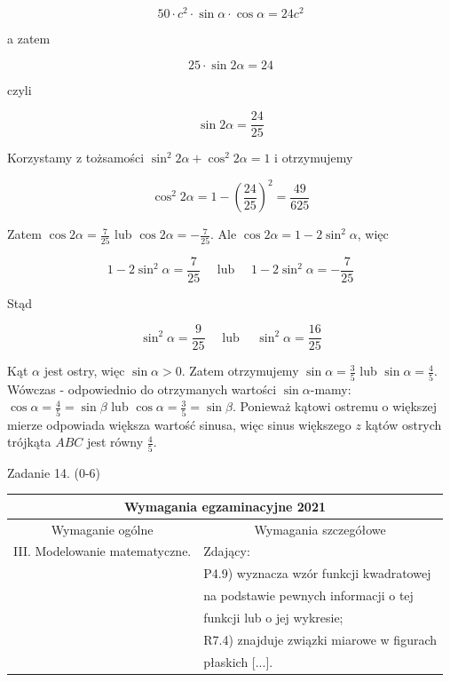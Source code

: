 \documentclass[10pt]{article}
\begin{document}
$$
50 \cdot c^{2} \cdot \sin \alpha \cdot \cos \alpha=24 c^{2}
$$

a zatem

$$
25 \cdot \sin 2 \alpha=24
$$

czyli

$$
\sin 2 \alpha=\frac{24}{25}
$$

Korzystamy z tożsamości $\sin ^{2} 2 \alpha+\cos ^{2} 2 \alpha=1$ i otrzymujemy

$$
\cos ^{2} 2 \alpha=1-\left(\frac{24}{25}\right)^{2}=\frac{49}{625}
$$

Zatem $\cos 2 \alpha=\frac{7}{25}$ lub $\cos 2 \alpha=-\frac{7}{25}$. Ale $\cos 2 \alpha=1-2 \sin ^{2} \alpha$, więc

$$
1-2 \sin ^{2} \alpha=\frac{7}{25} \quad \text { lub } \quad 1-2 \sin ^{2} \alpha=-\frac{7}{25}
$$

Stąd

$$
\sin ^{2} \alpha=\frac{9}{25} \quad \text { lub } \quad \sin ^{2} \alpha=\frac{16}{25}
$$

Kąt $\alpha$ jest ostry, więc $\sin \alpha>0$. Zatem otrzymujemy $\sin \alpha=\frac{3}{5}$ lub $\sin \alpha=\frac{4}{5}$.\\
Wówczas - odpowiednio do otrzymanych wartości $\sin \alpha$-mamy: $\cos \alpha=\frac{4}{5}=\sin \beta$ lub $\cos \alpha=\frac{3}{5}=\sin \beta$. Ponieważ kątowi ostremu o większej mierze odpowiada większa wartość sinusa, więc sinus większego $z$ kątów ostrych trójkąta $A B C$ jest równy $\frac{4}{5}$.

Zadanie 14. (0-6)

\begin{center}
\begin{tabular}{|l|l|}
\hline
\multicolumn{2}{|c|}{Wymagania egzaminacyjne 2021} \\
\hline
\multicolumn{1}{|c|}{Wymaganie ogólne} & \multicolumn{1}{c|}{Wymagania szczegółowe} \\
\hline
III. Modelowanie matematyczne. & Zdający: \\
 & P4.9) wyznacza wzór funkcji kwadratowej \\
 & na podstawie pewnych informacji o tej \\
 & funkcji lub o jej wykresie; \\
 & R7.4) znajduje związki miarowe w figurach \\
 & płaskich [...]. \\
\hline
\end{tabular}
\end{center}
\end{document}
